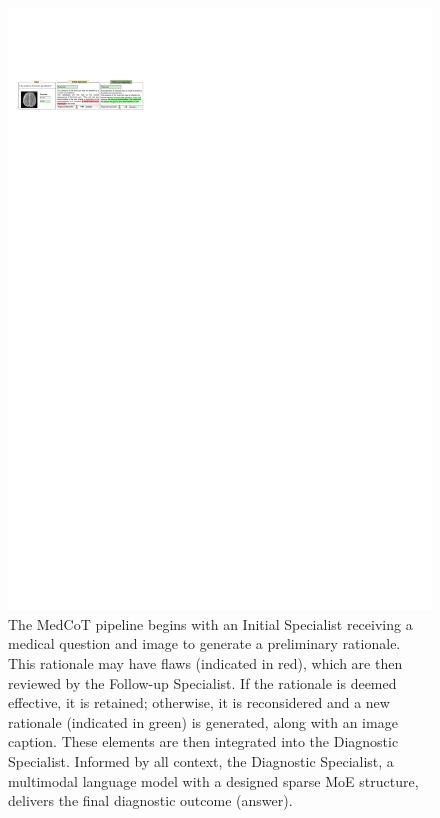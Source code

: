 \documentclass[11pt]{article}
\begin{document}
\begin{figure}
\centering
\includegraphics[width=\textwidth]{image/Figure_case1_v3.pdf}
\caption{
The MedCoT pipeline begins with an Initial Specialist receiving a medical question and image to generate a preliminary rationale. This rationale may have flaws (indicated in red), which are then reviewed by the Follow-up Specialist. If the rationale is deemed effective, it is retained; otherwise, it is reconsidered and a new rationale (indicated in green) is generated, along with an image caption. These elements are then integrated into the Diagnostic Specialist. Informed by all context, the Diagnostic Specialist, a multimodal language model with a designed sparse MoE structure, delivers the final diagnostic outcome (answer).
} 
\label{case1}
\end{figure}
\end{document}
